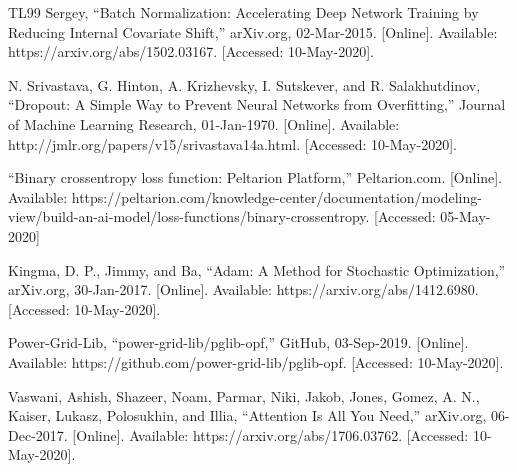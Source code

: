 \documentclass[11pt]{article}
\begin{document}
\begin{thebibliography} {TL99}
{\sc Sergey, }
“Batch Normalization: Accelerating Deep Network Training by Reducing Internal Covariate Shift,” arXiv.org, 02-Mar-2015. [Online]. Available: https://arxiv.org/abs/1502.03167. [Accessed: 10-May-2020].

{\sc N. Srivastava, G. Hinton, A. Krizhevsky, I. Sutskever, and R. Salakhutdinov,} 
“Dropout: A Simple Way to Prevent Neural Networks from Overfitting,” Journal of Machine Learning Research, 01-Jan-1970. [Online]. Available: http://jmlr.org/papers/v15/srivastava14a.html. [Accessed: 10-May-2020].

{\sc }
“Binary crossentropy loss function: Peltarion Platform,” Peltarion.com. [Online]. Available: https://peltarion.com/knowledge-center/documentation/modeling-view/build-an-ai-model/loss-functions/binary-crossentropy. [Accessed: 05-May-2020]

{\sc Kingma, D. P., Jimmy, and Ba,} 
“Adam: A Method for Stochastic Optimization,” arXiv.org, 30-Jan-2017. [Online]. Available: https://arxiv.org/abs/1412.6980. [Accessed: 10-May-2020].

Power-Grid-Lib, “power-grid-lib/pglib-opf,” GitHub, 03-Sep-2019. [Online]. Available: https://github.com/power-grid-lib/pglib-opf. [Accessed: 10-May-2020].

{\sc Vaswani, Ashish, Shazeer, Noam, Parmar, Niki, Jakob, Jones, Gomez, A. N., Kaiser, Lukasz, Polosukhin, and Illia,}  
“Attention Is All You Need,” arXiv.org, 06-Dec-2017. [Online]. Available: https://arxiv.org/abs/1706.03762. [Accessed: 10-May-2020].





\end{thebibliography}
\end{document}
